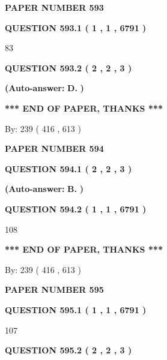\documentclass{ctexart}
\begin{document}
   
\newpage 
\setcounter{page}{ 
   593001 } 
   
   
 {\textbf{ \Large{ PAPER NUMBER  593  }}}
   
   
   
   
  
  
{\textbf{\large{QUESTION
593.1 
 ( 1 , 1 , 6791 )
}}}

83
  
  
{\textbf{\large{QUESTION
593.2 
 ( 2 , 2 , 3 )
}}}
 
 
{\textbf{(Auto-answer:}}
{\textbf{\large{
D.}}}
{\textbf{)}}
 
 
   
   
   
   
\vspace{1.0in} 
{\textbf{\large{ *** END OF PAPER, THANKS *** }}} 
   
   
\hspace{1.0in} By: 
 239 ( 416 ,  613 )
   
   
   
   
\newpage 
\setcounter{page}{ 
   594001 } 
   
   
 {\textbf{ \Large{ PAPER NUMBER  594  }}}
   
   
   
   
  
  
{\textbf{\large{QUESTION
594.1 
 ( 2 , 2 , 3 )
}}}
 
 
{\textbf{(Auto-answer:}}
{\textbf{\large{
B.}}}
{\textbf{)}}
 
 
  
  
{\textbf{\large{QUESTION
594.2 
 ( 1 , 1 , 6791 )
}}}

108
   
   
   
   
\vspace{1.0in} 
{\textbf{\large{ *** END OF PAPER, THANKS *** }}} 
   
   
\hspace{1.0in} By: 
 239 ( 416 ,  613 )
   
   
   
   
\newpage 
\setcounter{page}{ 
   595001 } 
   
   
 {\textbf{ \Large{ PAPER NUMBER  595  }}}
   
   
   
   
  
  
{\textbf{\large{QUESTION
595.1 
 ( 1 , 1 , 6791 )
}}}

107
  
  
{\textbf{\large{QUESTION
595.2 
 ( 2 , 2 , 3 )
}}}
 
\end{document}

